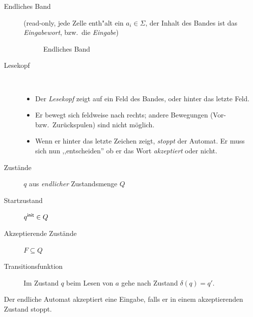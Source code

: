 \begin{description}
\item[Endliches Band] 
(read-only, jede Zelle enth"alt ein $a_i\in\Sigma$, der Inhalt des Bandes ist das \emph{Eingabewort}, bzw.\ die \emph{Eingabe})

\begin{figure}[H]\centering
        \caption{Endliches Band}
\end{figure}
\vspace{-1em}
\item[Lesekopf] ~\\
  \vspace{-\baselineskip}
  \begin{itemize}
        \item Der \emph{Lesekopf} zeigt auf ein Feld des Bandes, oder hinter das letzte Feld.
        \item Er bewegt sich feldweise nach rechts; andere Bewegungen (Vor- bzw.\ Zurückspulen) sind nicht möglich.
        \item Wenn er hinter das letzte Zeichen zeigt, \emph{stoppt} der Automat.
    Er muss sich nun ,,entscheiden'' ob er das Wort \emph{akzeptiert} oder nicht.
  \end{itemize}
\item[Zustände] $q$ aus \emph{endlicher} Zustandsmenge $Q$
\item[Startzustand] ${q^\mathsf{init}} \in Q$
\item[Akzeptierende Zustände] $F \subseteq Q$ 
\item[Transitionsfunktion] Im Zustand $q$ beim Lesen von $a$ gehe nach Zustand $\delta(q) = q'$.
\end{description}
Der endliche Automat akzeptiert eine Eingabe, falls er in einem akzeptierenden Zustand stoppt.

